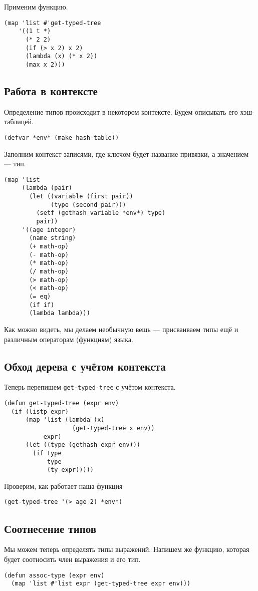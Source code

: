 \documentclass[a4paper,11pt]{article}
\begin{document}
Применим функцию.
\begin{verbatim}
(map 'list #'get-typed-tree
    '((1 t *)
      (* 2 2)
      (if (> x 2) x 2)
      (lambda (x) (* x 2))
      (max x 2)))
\end{verbatim}

\subsection{Работа в контексте}
\label{sec:org189b4cf}
Определение типов происходит в некотором контексте. Будем описывать его хэш-таблицей.
\begin{verbatim}
(defvar *env* (make-hash-table))
\end{verbatim}

Заполним контекст записями, где ключом будет название привязки, а значением — тип.
\begin{verbatim}
(map 'list
     (lambda (pair)
       (let ((variable (first pair))
             (type (second pair)))
         (setf (gethash variable *env*) type)
         pair))
     '((age integer)
       (name string)
       (+ math-op)
       (- math-op)
       (* math-op)
       (/ math-op)
       (> math-op)
       (< math-op)
       (= eq)
       (if if)
       (lambda lambda)))
\end{verbatim}

Как можно видеть, мы делаем необычную вещь — присваиваем типы ещё и различным операторам (функциям) языка.

\subsection{Обход дерева с учётом контекста}
\label{sec:orgb3b3989}
Теперь перепишем \texttt{get-typed-tree} с учётом контекста.
\begin{verbatim}
(defun get-typed-tree (expr env)
  (if (listp expr)
      (map 'list (lambda (x)
                   (get-typed-tree x env))
           expr)
      (let ((type (gethash expr env)))
        (if type
            type
            (ty expr)))))
\end{verbatim}

Проверим, как работает наша функция
\begin{verbatim}
(get-typed-tree '(> age 2) *env*)
\end{verbatim}

\subsection{Соотнесение типов}
\label{sec:orgfaa40b4}
Мы можем теперь определять типы выражений. Напишем же функцию, которая будет соотносить член выражения и его тип.
\begin{verbatim}
(defun assoc-type (expr env)
  (map 'list #'list expr (get-typed-tree expr env)))
\end{verbatim}
\end{document}
